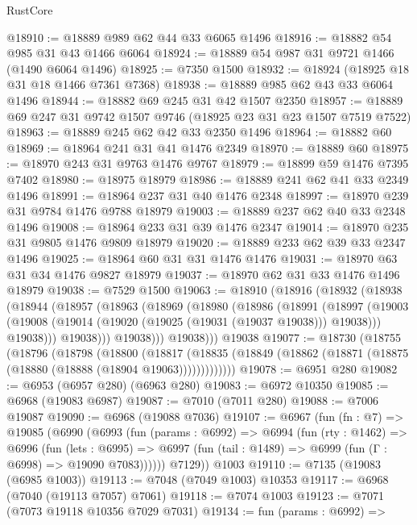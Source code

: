 \begin{lexlean}{RustCore}
\begin{coremodule}
@18910 := @18889 @989 @62 @44 @33 @6065 @1496
@18916 := @18882 @54 @985 @31 @43 @1466 @6064
@18924 := @18889 @54 @987 @31 @9721 @1466 (@1490 @6064 @1496)
@18925 := @7350 @1500
@18932 := @18924 (@18925 @18 @31 @18 @1466 @7361 @7368)
@18938 := @18889 @985 @62 @43 @33 @6064 @1496
@18944 := @18882 @69 @245 @31 @42 @1507 @2350
@18957 := @18889 @69 @247 @31 @9742 @1507 @9746 (@18925 @23 @31 @23 @1507 @7519 @7522)
@18963 := @18889 @245 @62 @42 @33 @2350 @1496
@18964 := @18882 @60
@18969 := @18964 @241 @31 @41 @1476 @2349
@18970 := @18889 @60
@18975 := @18970 @243 @31 @9763 @1476 @9767
@18979 := @18899 @59 @1476 @7395 @7402
@18980 := @18975 @18979
@18986 := @18889 @241 @62 @41 @33 @2349 @1496
@18991 := @18964 @237 @31 @40 @1476 @2348
@18997 := @18970 @239 @31 @9784 @1476 @9788 @18979
@19003 := @18889 @237 @62 @40 @33 @2348 @1496
@19008 := @18964 @233 @31 @39 @1476 @2347
@19014 := @18970 @235 @31 @9805 @1476 @9809 @18979
@19020 := @18889 @233 @62 @39 @33 @2347 @1496
@19025 := @18964 @60 @31 @31 @1476 @1476
@19031 := @18970 @63 @31 @34 @1476 @9827 @18979
@19037 := @18970 @62 @31 @33 @1476 @1496 @18979
@19038 := @7529 @1500
@19063 := @18910
    (@18916
      (@18932
        (@18938
          (@18944
            (@18957
              (@18963
                (@18969
                  (@18980
                    (@18986
                      (@18991
                        (@18997
                          (@19003
                            (@19008 (@19014 (@19020 (@19025 (@19031 (@19037 @19038))) @19038)))
                            @19038)))
                      @19038)))
                @19038)))
          @19038)))
    @19038
@19077 := @18730
    (@18755
      (@18796
        (@18798
          (@18800
            (@18817
              (@18835 (@18849 (@18862 (@18871 (@18875 (@18880 (@18888 (@18904 @19063)))))))))))))
@19078 := @6951 @280
@19082 := @6953 (@6957 @280) (@6963 @280)
@19083 := @6972 @10350
@19085 := @6968 (@19083 @6987)
@19087 := @7010 (@7011 @280)
@19088 := @7006 @19087
@19090 := @6968 (@19088 @7036)
@19107 := @6967
    (fun (fn : @7) =>
    @19085
      (@6990
        (@6993
          (fun (params : @6992) =>
          @6994
            (fun (rty : @1462) =>
            @6996
              (fun (lets : @6995) =>
              @6997 (fun (tail : @1489) => @6999 (fun (Γ : @6998) => @19090 @7083))))))
        @7129))
    @1003
@19110 := @7135 (@19083 (@6985 @1003))
@19113 := @7048 (@7049 @1003) @10353
@19117 := @6968 (@7040 (@19113 @7057) @7061)
@19118 := @7074 @1003
@19123 := @7071 (@7073 @19118 @10356 @7029 @7031)
@19134 := fun (params : @6992) =>

\end{coremodule}
\end{lexlean}
